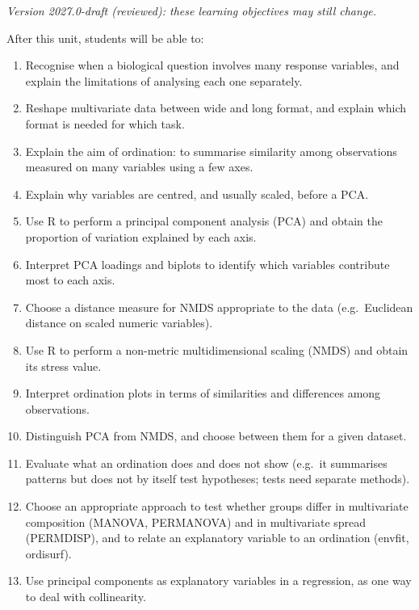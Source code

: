 \documentclass[
  letterpaper,
  8pt,
  a4paper]{book}
\providecommand{\tightlist}{%
  \setlength{\itemsep}{0pt}\setlength{\parskip}{0pt}}
\begin{document}
\begin{tcolorbox}[enhanced jigsaw, arc=.35mm, bottomrule=.15mm, bottomtitle=1mm, breakable, colback=white, colbacktitle=quarto-callout-note-color!10!white, colframe=quarto-callout-note-color-frame, coltitle=black, left=2mm, leftrule=.75mm, opacityback=0, opacitybacktitle=0.6, rightrule=.15mm, title=\textcolor{quarto-callout-note-color}{\faInfo}\hspace{0.5em}{Learning objectives}, titlerule=0mm, toprule=.15mm, toptitle=1mm]

\emph{Version 2027.0-draft (reviewed): these learning objectives may
still change.}

After this unit, students will be able to:

\begin{enumerate}
\def\labelenumi{\arabic{enumi}.}
\tightlist
\item
  Recognise when a biological question involves many response variables,
  and explain the limitations of analysing each one separately.
\item
  Reshape multivariate data between wide and long format, and explain
  which format is needed for which task.
\item
  Explain the aim of ordination: to summarise similarity among
  observations measured on many variables using a few axes.
\item
  Explain why variables are centred, and usually scaled, before a PCA.
\item
  Use R to perform a principal component analysis (PCA) and obtain the
  proportion of variation explained by each axis.
\item
  Interpret PCA loadings and biplots to identify which variables
  contribute most to each axis.
\item
  Choose a distance measure for NMDS appropriate to the data
  (e.g.~Euclidean distance on scaled numeric variables).
\item
  Use R to perform a non-metric multidimensional scaling (NMDS) and
  obtain its stress value.
\item
  Interpret ordination plots in terms of similarities and differences
  among observations.
\item
  Distinguish PCA from NMDS, and choose between them for a given
  dataset.
\item
  Evaluate what an ordination does and does not show (e.g.~it summarises
  patterns but does not by itself test hypotheses; tests need separate
  methods).
\item
  Choose an appropriate approach to test whether groups differ in
  multivariate composition (MANOVA, PERMANOVA) and in multivariate
  spread (PERMDISP), and to relate an explanatory variable to an
  ordination (envfit, ordisurf).
\item
  Use principal components as explanatory variables in a regression, as
  one way to deal with collinearity.
\end{enumerate}


\end{tcolorbox}
\end{document}
